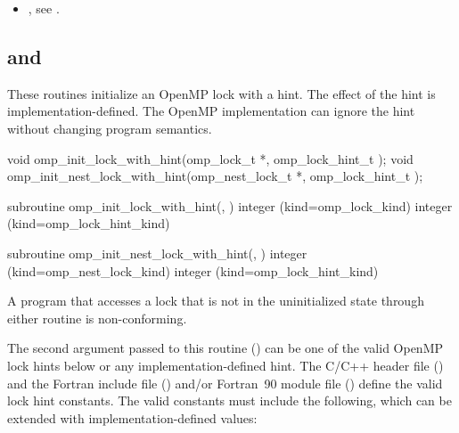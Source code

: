 \crossreferences
\begin{itemize}
\item {}, see
.
\end{itemize}











\subsection[\code{omp\_init\_lock\_with\_hint} and \\\code{omp\_init\_nest\_lock\_with\_hint}]{ and \\}
\label{subsec:omp_init_lock_with_hint and omp_init_nest_lock_with_hint}
\summary
These routines initialize an OpenMP lock with a hint.  
The effect of the hint is implementation-defined. The OpenMP implementation
can ignore the hint without changing program semantics.


\format
\ccppspecificstart
\begin{boxedcode}
void omp\_init\_lock\_with\_hint(omp\_lock\_t *, 
                             omp\_lock\_hint\_t );
void omp\_init\_nest\_lock\_with\_hint(omp\_nest\_lock\_t *, 
                                  omp\_lock\_hint\_t );
\end{boxedcode}
\ccppspecificend

\newpage %

\fortranspecificstart
\begin{boxedcode}
subroutine omp\_init\_lock\_with\_hint(, )
integer (kind=omp\_lock\_kind) 
integer (kind=omp\_lock\_hint\_kind) 

subroutine omp\_init\_nest\_lock\_with\_hint(, )
integer (kind=omp\_nest\_lock\_kind) 
integer (kind=omp\_lock\_hint\_kind) 
\end{boxedcode}
\fortranspecificend

\constraints
A program that accesses a lock that is not in the uninitialized state through either routine 
is non-conforming.

The second argument passed to this routine () can be one of the valid OpenMP lock hints below or any implementation-defined hint. 
The C/C++ header file () and the Fortran include file () and/or Fortran~90 module file () define the valid lock hint constants.  
The valid constants must include the following, which can be extended with implementation-defined values:


